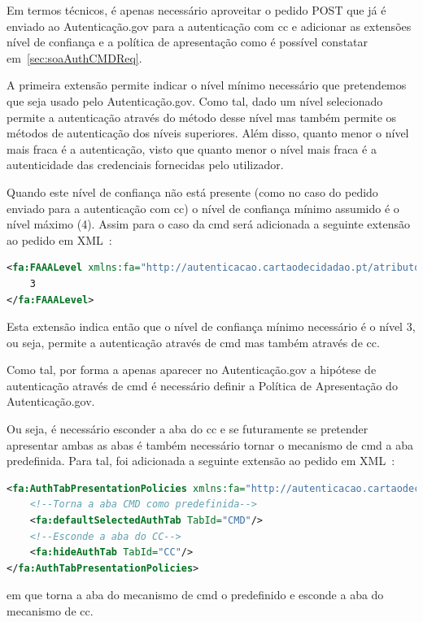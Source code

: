 Em termos técnicos, é apenas necessário aproveitar o pedido POST que já é enviado ao Autenticação.gov para a autenticação com \acrshort{cc} e adicionar as extensões nível de confiança e a política de apresentação como é possível constatar em~\ref{sec:soaAuthCMDReq}.

A primeira extensão permite indicar o nível mínimo necessário que pretendemos que seja usado pelo Autenticação.gov. Como tal, dado um nível selecionado permite a autenticação através do método desse nível mas também permite os métodos de autenticação dos níveis superiores. Além disso, quanto menor o nível mais fraca é a autenticação, visto que quanto menor o nível mais fraca é a autenticidade das credenciais fornecidas pelo utilizador.

Quando este nível de confiança não está presente (como no caso do pedido enviado para a autenticação com \acrshort{cc}) o nível de confiança mínimo assumido é o nível máximo (4). Assim para o caso da \acrshort{cmd} será adicionada a seguinte extensão ao pedido em XML~\cite{agov2}:
\begin{lstlisting}[language=xml, caption=Extensão Nível de Confiança no pedido enviado ao Autenticação.gov]
<fa:FAAALevel xmlns:fa="http://autenticacao.cartaodecidadao.pt/atributos">
    3
</fa:FAAALevel>
\end{lstlisting}
Esta extensão indica então que o nível de confiança mínimo necessário é o nível 3, ou seja, permite a autenticação através de \acrshort{cmd} mas também através de \acrshort{cc}.

Como tal, por forma a apenas aparecer no Autenticação.gov a hipótese de autenticação através de \acrshort{cmd} é necessário definir a Política de Apresentação do Autenticação.gov.

Ou seja, é necessário esconder a aba do \acrfull{cc} e se futuramente se pretender apresentar ambas as abas é também necessário tornar o mecanismo de \acrfull{cmd} a aba predefinida. Para tal, foi adicionada a seguinte extensão ao pedido em XML~\cite{agov2}:
\begin{lstlisting}[language=xml, caption=Extensão Política de Apresentação no pedido enviado ao Autenticação.gov]
<fa:AuthTabPresentationPolicies xmlns:fa="http://autenticacao.cartaodecidadao.pt/presentationpolicy">
    <!--Torna a aba CMD como predefinida-->
    <fa:defaultSelectedAuthTab TabId="CMD"/>
    <!--Esconde a aba do CC-->
    <fa:hideAuthTab TabId="CC"/> 
</fa:AuthTabPresentationPolicies>
\end{lstlisting}
em que torna a aba do mecanismo de \acrshort{cmd} o predefinido e esconde a aba do mecanismo de \acrshort{cc}.

